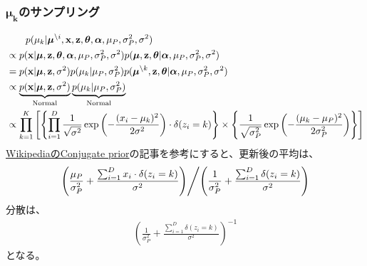 \documentclass[a4paper,10.5pt,uplatex]{jsarticle}  %
\newcommand{\btheta}{\boldsymbol{\theta}}
\newcommand{\balpha}{\boldsymbol{\alpha}}
\newcommand{\bmu}{\boldsymbol{\mu}}
\newcommand{\bz}{\mathbf{z}}
\newcommand{\bx}{\mathbf{x}}
\newcommand{\deli}{{\backslash i}}
\begin{document}
\subsubsection{$\boldsymbol{\mu_k}$のサンプリング}
\begin{align}
  &\qquad p(\mu_k | \bmu^\deli, \bx, \bz, \btheta, \balpha, \mu_P, \sigma^2_P, \sigma^2) \\
  &\propto p(\bx | \bmu, \bz, \btheta, \balpha, \mu_P, \sigma_P^2, \sigma^2) p(\bmu, \bz, \btheta | \balpha, \mu_P, \sigma_P^2, \sigma^2)\\
  &= p(\bx | \bmu, \bz, \sigma^2) p(\mu_k | \mu_P, \sigma^2_P) p(\bmu^{\backslash k}, \bz, \btheta | \balpha, \mu_P, \sigma_P^2, \sigma^2)\\
  &\propto \underbrace{p(\bx | \bmu, \bz, \sigma^2)}_{\rm Normal} \underbrace{ p(\mu_k | \mu_P, \sigma^2_P)}_{\rm Normal} \\
  &\propto \prod_{k=1}^{K} \left[ \left\{ \prod_{i=1}^{D} \frac{1}{\sqrt{\sigma^2}} \exp \left( - \frac{(x_i - \mu_k)^2}{2 \sigma^2} \right)  \cdot \delta(z_i = k) \right\} \times \left\{  \frac{1}{\sqrt{\sigma_P^2}} \exp \left(  - \frac{(\mu_k - \mu_P)^2}{2 \sigma_P^2} \right) \right\} \right]
\end{align}
\href{https://en.wikipedia.org/wiki/Conjugate_prior#Table_of_conjugate_distributions}{WikipediaのConjugate prior}の記事を参考にすると、更新後の平均は、
\begin{align}
  \left. \left( \frac{\mu_P}{\sigma_P^2} + \frac{\sum_{i=1}^{D} x_i \cdot \delta(z_i=k)}{\sigma^2} \right) \middle/ \left( \frac{1}{\sigma_P^2} + \frac{\sum_{i=1}^{D} \delta (z_i = k)}{\sigma^2} \right)   \right.
\end{align}
分散は、
\begin{align}
  \left( \frac{1}{\sigma^2_P} + \frac{\sum_{i=1}^{D} \delta(z_i=k)}{\sigma^2} \right)^{-1}
\end{align}
となる。
\end{document}
